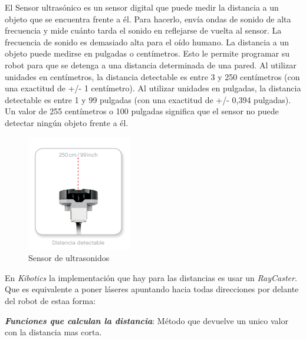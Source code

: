 El Sensor ultrasónico es un sensor digital que puede medir la
distancia a un objeto que se encuentra frente a él. Para hacerlo,
envía ondas de sonido de alta frecuencia y mide cuánto tarda el
sonido en reflejarse de vuelta al sensor. La frecuencia de sonido
es demasiado alta para el oído humano.
La distancia a un objeto puede medirse en pulgadas o centímetros.
Esto le permite programar su robot para que se detenga a una
distancia determinada de una pared.
Al utilizar unidades en centímetros, la distancia detectable es entre
3 y 250 centímetros (con una exactitud de +/- 1 centímetro). Al utilizar
unidades en pulgadas, la distancia detectable es entre 1 y 99
pulgadas (con una exactitud de +/- 0,394 pulgadas). Un valor de
255 centímetros o 100 pulgadas significa que el sensor no puede
detectar ningún objeto frente a él.\newline
\begin{figure}
    \centering
    \includegraphics[width=0.5\linewidth]{img/ultrasonidos.png}
    \caption{Sensor de ultrasonidos}
    \label{fig:ultrasonido}
\end{figure}
En \textit{Kibotics} la implementación que hay para las distancias es  usar un \textit{RayCaster}. Que es equivalente a poner láseres apuntando hacia todas direcciones por delante del robot de estaa forma:


\textit{\textbf{Funciones que calculan la distancia}}: Método que devuelve  un unico valor con la distancia mas corta. 


